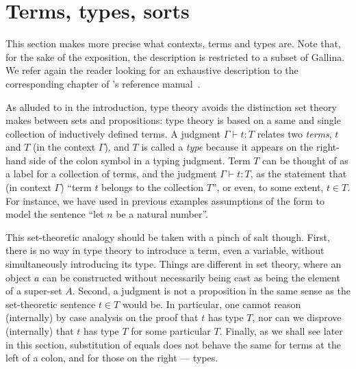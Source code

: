 



\section{Terms, types, sorts}\label{sec:terms}

This section makes more precise what contexts, terms and types
are. Note that,
for the sake of the exposition,
the description is restricted to a subset of Gallina.
We refer again the reader looking for
an exhaustive description to the corresponding chapter of \Coq{}'s
reference manual~\cite{Coq:manual}.

As alluded to in the introduction, type theory avoids the distinction
set theory makes between sets and propositions: type theory is based
on a same and single collection of inductively defined terms. A
judgment $\Gamma \vdash t : T$ relates two \emph{terms}, $t$ and $T$ (in the
context $\Gamma$), and $T$ is called a \emph{type} because it appears
on the right-hand side of the colon symbol in a typing judgment. Term $T$ can be
thought of as a label for a collection of terms, and the judgment
$\Gamma \vdash t : T$, as the statement that (in context $\Gamma$)
``term $t$ belongs to the collection $T$'', or even, to some extent,
$t\in T$. 
For instance, we have used in previous examples assumptions of the
form  to model the sentence ``let $n$ be a natural number''.

This set-theoretic analogy should be taken with a pinch of salt
though. First, there is no way in type theory to introduce a term, even
a variable, without simultaneously introducing its type. Things are
different in set theory, where an object $a$ can be constructed without
necessarily being cast as being the element of a super-set
$A$. Second, a judgment is not a proposition in the same sense as the
set-theoretic sentence $t \in T$ would be. In particular, one cannot
reason (internally) by case analysis on the proof that
$t$ has type $T$, nor can we disprove (internally) that $t$ has type $T$ for some particular
$T$. Finally, as we shall see later in this section, substitution of
equals does not behave the same for terms at the left of a colon, and
for those on the right --- types.


